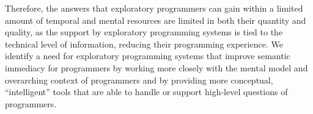 Therefore, the answers that exploratory programmers can gain within a limited amount of temporal and mental resources are limited in both their quantity and quality, as the support by exploratory programming systems is tied to the technical level of information, reducing their programming experience.
We identify a need for exploratory programming systems that improve semantic immediacy for programmers by working more closely with the mental model and overarching context of programmers and by providing more conceptual, ``intelligent'' tools that are able to handle or support high-level questions of programmers.
